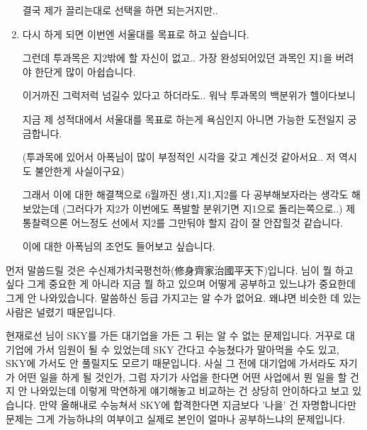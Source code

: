 \begin{enumerate}
    결국 제가 끌리는대로 선택을 하면 되는거지만..
    \vspace{5mm}
    
    \item 
    \vspace{5mm}
    
    다시 하게 되면 이번엔 서울대를 목표로 하고 싶습니다.
    \vspace{5mm}
    
    그런데 투과목은 지2밖에 할 자신이 없고.. 가장 완성되어있던 과목인 지1을 버려야 한단게 많이 아쉽습니다.
    \vspace{5mm}
    
    이거까진 그럭저럭 넘길수 있다고 하더라도.. 워낙 투과목의 백분위가 헬이다보니
    \vspace{5mm}
    
    지금 제 성적대에서 서울대를 목표로 하는게 욕심인지 아니면 가능한 도전일지 궁금합니다.
    \vspace{5mm}
    
    (투과목에 있어서 아폭님이 많이 부정적인 시각을 갖고 계신것 같아서요.. 저 역시도 불안한게 사실이구요)
    \vspace{5mm}
    
    그래서 이에 대한 해결책으로 6월까진 생1,지1,지2를 다 공부해보자라는 생각도 해보았는데 (그러다가 지2가 이번에도 폭발할 분위기면 지1으로 돌리는쪽으로..) 제 통찰력으론 어느정도 선에서 지2를 그만둬야 할지 감이 잘 안잡힐것 같습니다.
    \vspace{5mm}
    
    이에 대한 아폭님의 조언도 들어보고 싶습니다.
\end{enumerate}
\vspace{5mm}

먼저 말씀드릴 것은 수신제가치국평천하(修身齊家治國平天下)입니다.
님이 뭘 하고 싶다 그게 중요한 게 아니라 지금 뭘 하고 있으며 어떻게 공부하고 있느냐가 중요한데 그게 안 나와있습니다.
말씀하신 등급 가지고는 알 수가 없어요. 왜냐면 비슷한 데 있는 사람은 널렸기 때문입니다.
\vspace{5mm}

현재로선 님이 SKY를 가든 대기업을 가든 그 뒤는 알 수 없는 문제입니다.
거꾸로 대기업에 가서 임원이 될 수 있었는데 SKY 간다고 수능쳤다가 말아먹을 수도 있고, SKY에 가서도 안 풀릴지도 모르기 때문입니다.
사실 그 전에 대기업에 가서라도 자기가 어떤 일을 하게 될 것인가, 그럼 자기가 사업을 한다면 어떤 사업에서 뭔 일을 할 건지 안 나와있는데
이렇게 막연하게 얘기해놓고 비교하는 건 상당히 안이하다고 보고 있습니다.
만약 올해내로 수능쳐서 SKY에 합격한다면 지금보다 '나을' 건 자명합니다만 문제는 그게 가능하냐의 여부이고
실제로 본인이 얼마나 공부하느냐의 문제입니다.
\vspace{5mm}

